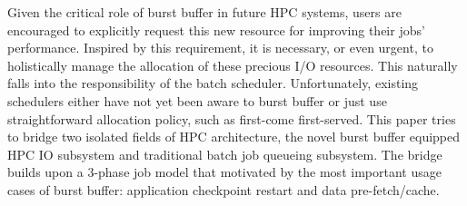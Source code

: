 

Given the critical role of burst buffer in future HPC systems,
users are encouraged to explicitly request this new resource for
improving their jobs' performance\cite{apex-workflow}.
Inspired by this requirement, it is necessary, or even urgent, to holistically manage
the allocation of these precious I/O resources.
This naturally falls into the responsibility of the batch scheduler.
Unfortunately, existing schedulers
either have not yet been aware to burst buffer\cite{Moab, Cobalt}
or just use straightforward allocation policy, such as first-come first-served\cite{SlurmBBGuide}.
This paper tries to bridge two isolated fields of HPC architecture,
the novel burst buffer equipped HPC IO subsystem and
traditional batch job queueing subsystem.
The bridge builds upon a 3-phase job model that motivated by the most
important usage cases of burst buffer:
application checkpoint restart and data pre-fetch/cache.

